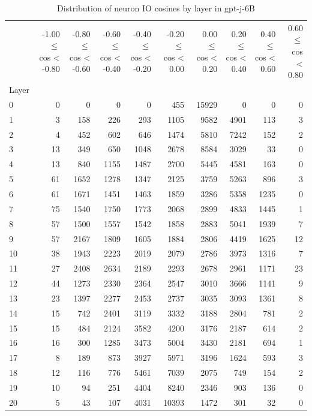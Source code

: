 \begin{table}
\caption{Distribution of neuron IO cosines by layer in gpt-j-6B}
\label{tab:gpt-j-6B_half_coarse}
\begin{tabular}{lrrrrrrrrr}
 & -1.00 $\leq$ cos < -0.80 & -0.80 $\leq$ cos < -0.60 & -0.60 $\leq$ cos < -0.40 & -0.40 $\leq$ cos < -0.20 & -0.20 $\leq$ cos < 0.00 & 0.00 $\leq$ cos < 0.20 & 0.20 $\leq$ cos < 0.40 & 0.40 $\leq$ cos < 0.60 & 0.60 $\leq$ cos < 0.80 \\
Layer &  &  &  &  &  &  &  &  &  \\
0 & 0 & 0 & 0 & 0 & 455 & 15929 & 0 & 0 & 0 \\
1 & 3 & 158 & 226 & 293 & 1105 & 9582 & 4901 & 113 & 3 \\
2 & 4 & 452 & 602 & 646 & 1474 & 5810 & 7242 & 152 & 2 \\
3 & 13 & 349 & 650 & 1048 & 2678 & 8584 & 3029 & 33 & 0 \\
4 & 13 & 840 & 1155 & 1487 & 2700 & 5445 & 4581 & 163 & 0 \\
5 & 61 & 1652 & 1278 & 1347 & 2125 & 3759 & 5263 & 896 & 3 \\
6 & 61 & 1671 & 1451 & 1463 & 1859 & 3286 & 5358 & 1235 & 0 \\
7 & 75 & 1540 & 1750 & 1773 & 2068 & 2899 & 4833 & 1445 & 1 \\
8 & 57 & 1500 & 1557 & 1542 & 1858 & 2883 & 5041 & 1939 & 7 \\
9 & 57 & 2167 & 1809 & 1605 & 1884 & 2806 & 4419 & 1625 & 12 \\
10 & 38 & 1943 & 2223 & 2019 & 2079 & 2786 & 3973 & 1316 & 7 \\
11 & 27 & 2408 & 2634 & 2189 & 2293 & 2678 & 2961 & 1171 & 23 \\
12 & 44 & 1273 & 2330 & 2364 & 2547 & 3010 & 3666 & 1141 & 9 \\
13 & 23 & 1397 & 2277 & 2453 & 2737 & 3035 & 3093 & 1361 & 8 \\
14 & 15 & 742 & 2401 & 3119 & 3332 & 3188 & 2804 & 781 & 2 \\
15 & 15 & 484 & 2124 & 3582 & 4200 & 3176 & 2187 & 614 & 2 \\
16 & 16 & 300 & 1285 & 3473 & 5004 & 3430 & 2181 & 694 & 1 \\
17 & 8 & 189 & 873 & 3927 & 5971 & 3196 & 1624 & 593 & 3 \\
18 & 12 & 116 & 776 & 5461 & 7039 & 2075 & 749 & 154 & 2 \\
19 & 10 & 94 & 251 & 4404 & 8240 & 2346 & 903 & 136 & 0 \\
20 & 5 & 43 & 107 & 4031 & 10393 & 1472 & 301 & 32 & 0 \\

\end{tabular}
\end{table}
